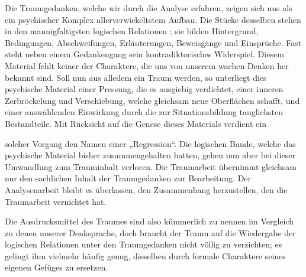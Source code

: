 \documentclass{article}
\begin{document}
            
        \pstart
        Die Traumgedanken, welche wir durch die Analyse erfahren, zeigen sich uns als
               ein psychischer Komplex 
     allerverwickeltstem Aufbau. Die Stücke desselben stehen in den
               mannigfaltigsten logischen Relationen 
    ; sie bilden 
     Hintergrund, Bedingungen, Abschweifungen, Erläuterungen,
               Beweisgänge und Einsprüche. Fast 
     steht neben einem Gedankengang sein kontradiktorisches
               Widerspiel. Diesem Material fehlt keiner der Charaktere, die uns von unserem
               wachen Denken her bekannt sind. Soll nun aus alledem ein Traum werden, so
                  unterliegt dies psychische Material einer Pressung, die es
               ausgiebig verdichtet, einer inneren Zerbröckelung und Verschiebung, welche
               gleichsam neue Oberflächen schafft, und einer auswählenden Einwirkung durch die
               zur Situationsbildung tauglichsten Bestandteile. Mit Rücksicht auf
               die Genese dieses Materials verdient ein
        \pend
    
         
            
            
            
        \pstart
        solcher Vorgang den Namen einer „Regression“. Die logischen Bande, welche das psychische Material bisher
               zusammengehalten hatten, gehen nun aber bei dieser Umwandlung zum
               Trauminhalt verloren. Die Traumarbeit übernimmt gleichsam nur den sachlichen Inhalt der Traumgedanken zur Bearbeitung. Der Analysenarbeit bleibt es überlassen, den Zusammenhang herzustellen, den
               die Traumarbeit vernichtet hat.
        \pend
    
            
        \pstart
        Die Ausdrucksmittel des Traumes sind also kümmerlich zu nennen im Vergleich zu
               denen unserer Denksprache, doch braucht der Traum auf die Wiedergabe der
               logischen Relationen unter den Traumgedanken nicht völlig zu verzichten; es
               gelingt ihm vielmehr häufig genug, dieselben durch formale Charaktere
               seines eigenen Gefüges zu ersetzen.
        \pend
    
\end{document}
